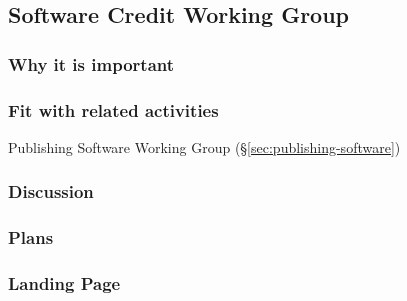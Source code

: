 \subsection{Software Credit Working Group}

\subsubsection{Why it is important}

\subsubsection{Fit with related activities}

Publishing Software Working Group (\S\ref{sec:publishing-software})

\subsubsection{Discussion}

\subsubsection{Plans}

\subsubsection{Landing Page}

